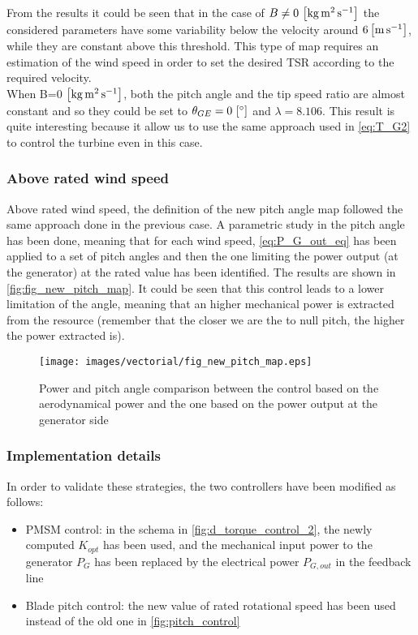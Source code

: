From the results it could be seen that in the case of $B\neq0 \, \left[\si{\kilo\gram\square\meter\per\second}\right]$ the considered parameters have some variability below the velocity around $6 \left[\si{\meter\per\second}\right]$, while they are constant above this threshold. This type of map requires an estimation of the wind speed in order to set the desired TSR according to the required velocity.  \\ 
When B=0 $\left[\si{\kilo\gram\square\meter\per\second}\right]$, both the pitch angle and the tip speed ratio are almost constant and so they could be set to $\theta_{GE}= 0 \, \left[\si{\degree}\right]$ and $\lambda=8.106$. This result is quite interesting because it allow us to use the same approach used in \autoref{eq:T_G2} to control the turbine even in this case. 

\subsubsection{Above rated wind speed}
Above rated wind speed, the definition of the new pitch angle map followed the same approach done in the previous case. A parametric study in the pitch angle has been done, meaning that for each wind speed, \autoref{eq:P_G_out_eq} has been applied to a set of pitch angles and then the one limiting the power output (at the generator) at the rated value has been identified. The results are shown in \autoref{fig:fig_new_pitch_map}. It could be seen that this control leads to a lower limitation of the angle, meaning that an higher mechanical power is extracted from the resource (remember that the closer we are the to null pitch, the higher the power extracted is).
\begin{figure}[htb]
  \centering
  \texttt{[image: images/vectorial/fig\_new\_pitch\_map.eps]}
  \caption{Power and pitch angle comparison between the control based on the aerodynamical power and the one based on the power output at the generator side}
  \label{fig:fig_new_pitch_map}
\end{figure}

\subsubsection{Implementation details}
In order to validate these strategies, the two controllers have been modified as follows:
\begin{itemize}
  \item PMSM control: in the schema in \autoref{fig:d_torque_control_2}, the newly computed  $K_{opt}$ has been used, and the mechanical input power to the generator $P_G$ has been replaced by the electrical power $P_{G, out}$ in the feedback line
  \item Blade pitch control: the new value of rated rotational speed has been used instead of the old one in \autoref{fig:pitch_control}
\end{itemize}

